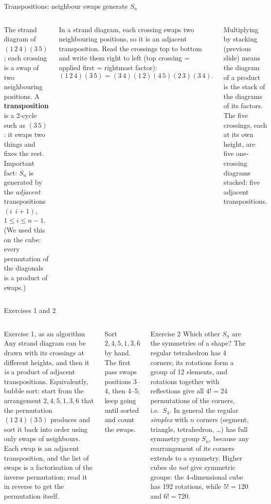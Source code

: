 \documentclass[aspectratio=169,10pt]{beamer}
\begin{document}
\begin{frame}{Transpositions: neighbour swaps generate $S_n$}
\begin{columns}[T]
\centering\scalebox{0.72}{\figbraid}\par
{\scriptsize The strand diagram of $(1\,2\,4)(3\,5)$; each crossing is a swap of two neighbouring positions.}
\small A \textbf{transposition} is a 2-cycle such as $(3\,5)$: it swaps two things and fixes the rest. Important fact: $S_n$ is generated by the \emph{adjacent} transpositions $(i\;\,i{+}1)$, $1\le i\le n-1$. (We used this on the cube: every permutation of the diagonals is a product of swaps.)
\vspace{4pt}

In a strand diagram, each crossing swaps two neighbouring positions, so it is an adjacent transposition. Read the crossings top to bottom and write them right to left (top crossing = applied first = rightmost factor):
\[
(1\,2\,4)(3\,5)=(3\,4)(1\,2)(4\,5)(2\,3)(3\,4).
\]
\begin{whybox}
Multiplying by stacking (previous slide) means the diagram of a product is the stack of the diagrams of its factors. The five crossings, each at its own height, are five one-crossing diagrams stacked: five adjacent transpositions.
\end{whybox}
\end{columns}
\end{frame}

\begin{frame}{Exercises 1 and 2}
\begin{columns}[T]
\begin{exbox}{Exercise 1, as an algorithm}
Any strand diagram can be drawn with its crossings at different heights, and then it \emph{is} a product of adjacent transpositions. Equivalently, bubble sort: start from the arrangement $2,4,5,1,3,6$ that the permutation $(1\,2\,4)(3\,5)$ produces and sort it back into order using only swaps of neighbours. Each swap is an adjacent transposition, and the list of swaps is a factorisation of the inverse permutation; read it in reverse to get the permutation itself.
\end{exbox}
\begin{trybox}
Sort $2,4,5,1,3,6$ by hand. The first pass swaps positions 3--4, then 4--5; keep going until sorted and count the swaps.
\end{trybox}
\begin{exbox}{Exercise 2}
Which other $S_n$ are the symmetries of a shape? The regular tetrahedron has 4 corners; its rotations form a group of 12 elements, and rotations together with reflections give all $4!=24$ permutations of the corners, i.e.\ $S_4$. In general the regular \emph{simplex} with $n$ corners (segment, triangle, tetrahedron, \dots) has full symmetry group $S_n$, because any rearrangement of its corners extends to a symmetry. Higher cubes do \emph{not} give symmetric groups: the 4-dimensional cube has 192 rotations, while $5!=120$ and $6!=720$.
\end{exbox}
\end{columns}
\end{frame}
\end{document}
